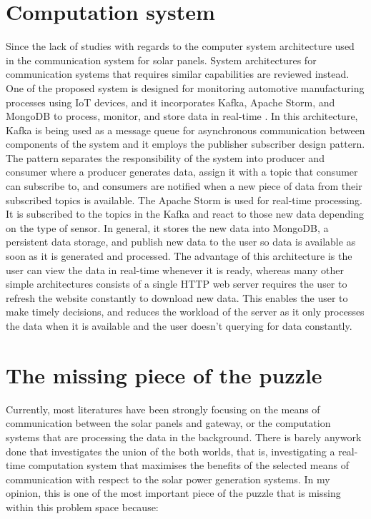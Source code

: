 \documentclass[../thesis.tex]{subfiles}
\begin{document}
\section{Computation system}

Since the lack of studies with regards to the computer system architecture used in the communication system for solar panels. System architectures for communication systems that requires similar capabilities are reviewed instead. One of the proposed system is designed for monitoring automotive manufacturing processes using IoT devices, and it incorporates Kafka, Apache Storm, and MongoDB to process, monitor, and store data in real-time \cite{Syafrudin_2018}. In this architecture, Kafka is being used as a message queue for asynchronous communication between components of the system and it employs the publisher subscriber design pattern. The pattern separates the responsibility of the system into producer and consumer where a producer generates data, assign it with a topic that consumer can subscribe to, and consumers are notified when a new piece of data from their subscribed topics is available. The Apache Storm is used for real-time processing. It is subscribed to the topics in the Kafka and react to those new data depending on the type of sensor. In general, it stores the new data into MongoDB, a persistent data storage, and publish new data to the user so data is available as soon as it is generated and processed. The advantage of this architecture is the user can view the data in real-time whenever it is ready, whereas many other simple architectures consists of a single HTTP web server requires the user to refresh the website constantly to download new data. This enables the user to make timely decisions, and reduces the workload of the server as it only processes the data when it is available and the user doesn't querying for data constantly.


\section{The missing piece of the puzzle}

Currently, most literatures have been strongly focusing on the means of communication between the solar panels and gateway, or the computation systems that are processing the data in the background. There is barely anywork done that investigates the union of the both worlds, that is, investigating a real-time computation system that maximises the benefits of the selected means of communication with respect to the solar power generation systems. In my opinion, this is one of the most important piece of the puzzle that is missing within this problem space because:
\end{document}
